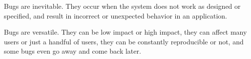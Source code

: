 Bugs 
  are inevitable. They occur when the system does not work as designed or specified,
  and result in incorrect or unexpected behavior in an application.

  Bugs are versatile. 
  They can be low impact or high impact, 
  they can affect many users or just a handful of users, 
  they can be constantly reproducible or not,
  and some bugs even go away and come back later. 